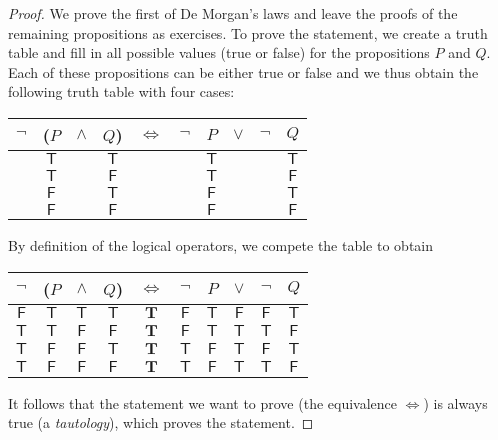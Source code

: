\documentclass{tstextbook}
\begin{document}
\begin{proof}
    \newcommand{\T}{\mathsf{T}}
    \newcommand{\TT}{\mathbf{T}}
    \renewcommand{\F}{\mathsf{F}}
    We prove the first of De Morgan's laws and leave the proofs of
    the remaining propositions as exercises. To prove the statement,
    we create a truth table and fill in all possible values (true or
    false) for the propositions $P$ and $Q$. Each of these propositions
    can be either true or false and we thus obtain the following truth
    table with four cases:
    \begin{center}
        \begin{tabular}{cccccccccc}
            $\lnot$ & ($P$ & $\land$ & $Q$) & $\Leftrightarrow$ & $\lnot$ & $P$  & $\lor$ & $\lnot$ & $Q$  \\
            \midrule
                    & $\T$ &         & $\T$ &                   &         & $\T$ &        &         & $\T$ \\
                    & $\T$ &         & $\F$ &                   &         & $\T$ &        &         & $\F$ \\
                    & $\F$ &         & $\T$ &                   &         & $\F$ &        &         & $\T$ \\
                    & $\F$ &         & $\F$ &                   &         & $\F$ &        &         & $\F$
        \end{tabular}
    \end{center}
    By definition of the logical operators, we compete the table to obtain
    \begin{center}
        \begin{tabular}{cccccccccc}
            $\lnot$ & ($P$ & $\land$ & $Q$) & $\Leftrightarrow$ & $\lnot$ & $P$  & $\lor$ & $\lnot$ & $Q$  \\
            \midrule
            $\F$    & $\T$ & $\T$    & $\T$ & $\TT$             & $\F$    & $\T$ & $\F$   & $\F$    & $\T$ \\
            $\T$    & $\T$ & $\F$    & $\F$ & $\TT$             & $\F$    & $\T$ & $\T$   & $\T$    & $\F$ \\
            $\T$    & $\F$ & $\F$    & $\T$ & $\TT$             & $\T$    & $\F$ & $\T$   & $\F$    & $\T$ \\
            $\T$    & $\F$ & $\F$    & $\F$ & $\TT$             & $\T$    & $\F$ & $\T$   & $\T$    & $\F$
        \end{tabular}
    \end{center}
    It follows that the statement we want to prove (the equivalence $\Leftrightarrow$)
    is always true (a \emph{tautology}), which proves the statement.
\end{proof}
\end{document}

